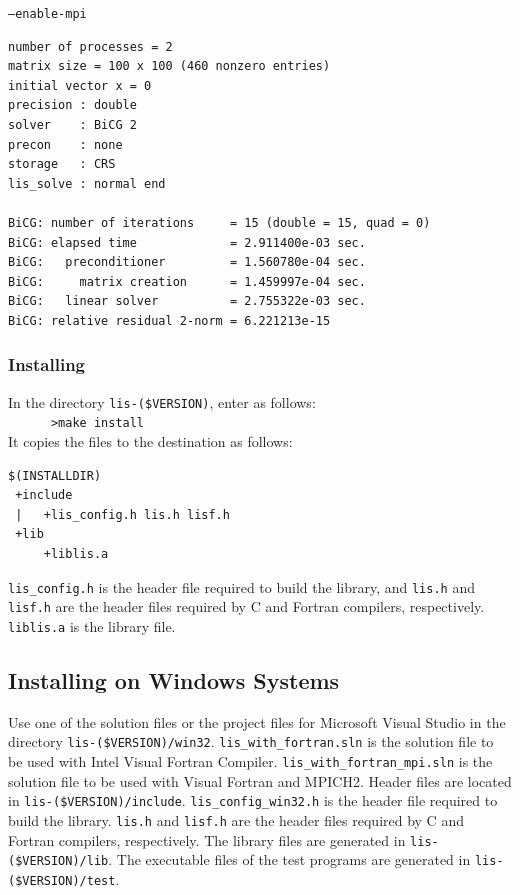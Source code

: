 \documentclass[a4paper]{article}
\begin{document}
\begin{itembox}[l]{\tt --enable-mpi}
 \begin{minipage}{10cm}
 \begin{verbatim}
number of processes = 2
matrix size = 100 x 100 (460 nonzero entries)
initial vector x = 0
precision : double
solver    : BiCG 2
precon    : none
storage   : CRS
lis_solve : normal end

BiCG: number of iterations     = 15 (double = 15, quad = 0)
BiCG: elapsed time             = 2.911400e-03 sec.
BiCG:   preconditioner         = 1.560780e-04 sec. 
BiCG:     matrix creation      = 1.459997e-04 sec.
BiCG:   linear solver          = 2.755322e-03 sec.
BiCG: relative residual 2-norm = 6.221213e-15
 \end{verbatim}
 \end{minipage}
\end{itembox}

\newpage
\subsubsection{Installing}
In the directory {\tt lis-(\$VERSION)}, enter as follows:\\
 \verb+      >make install+\\
It copies the files to the destination as follows:

\begin{verbatim}
$(INSTALLDIR)
 +include
 |   +lis_config.h lis.h lisf.h
 +lib
     +liblis.a
\end{verbatim}

{\tt lis\_config.h} is the header file required to build the library, and 
{\tt lis.h} and {\tt lisf.h} are the header files required 
by C and Fortran compilers, respectively. 
{\tt liblis.a} is the library file.

\subsection{Installing on Windows Systems}
Use one of the solution files or the project files for Microsoft Visual
Studio in the directory {\tt lis-(\$VERSION)/win32}. 
{\tt lis\_with\_fortran.sln} is the 
solution file to be used with Intel Visual Fortran Compiler. 
{\tt lis\_with\_fortran\_mpi.sln} is the solution file to be used 
with Visual Fortran and MPICH2. 
Header files are located in {\tt lis-(\$VERSION)/include}. 
{\tt lis\_config\_win32.h} is the header file required to 
build the library. {\tt lis.h} and {\tt lisf.h} are the header 
files required by C and Fortran compilers, respectively. 
The library files are generated in {\tt lis-(\$VERSION)/lib}.
The executable files of the test programs are generated 
in {\tt lis-(\$VERSION)/test}. 
\end{document}

